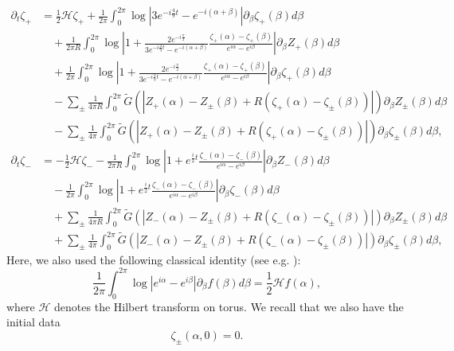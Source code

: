 \documentclass[11pt,reqno]{amsproc}
\newcommand{\ze}{\zeta}
\newcommand{\p}{\partial}
\newcommand{\pt}{\p_t}
\newcommand{\pb}{\p_\beta}
\newcommand{\calH}{\mathcal{H}}
\begin{document}
\begin{equation}
    \label{contourper}
    \begin{aligned}
    \pt \ze_+ &= \frac12 \calH \ze_+ + \frac{1}{2\pi}\int_0^{2\pi}\log\left|3e^{-i\frac49 t} - e^{-i(\alpha + \beta)}\right|\pb \ze_+(\beta) d\beta\\
    &\quad + \frac{1}{2\pi R}\int_0^{2\pi}\log\left|1+\frac{2e^{-i\frac\pi2}}{3e^{-i\frac49 t} - e^{-i(\alpha + \beta)}}\frac{\ze_+(\alpha)-\ze_+(\beta)}{e^{i\alpha} - e^{i\beta}}\right|\pb Z_+(\beta) d\beta\\
    &\quad + \frac{1}{2\pi}\int_0^{2\pi}\log\left|1+\frac{2e^{-i\frac\pi2}}{3e^{-i\frac49 t} - e^{-i(\alpha + \beta)}}\frac{\ze_+(\alpha)-\ze_+(\beta)}{e^{i\alpha} - e^{i\beta}}\right|\pb \ze_+(\beta) d\beta\\
    &\quad - \sum_{\pm} \frac{1}{4\pi R} \int_0^{2\pi} \tilde G(|Z_+(\alpha) - Z_\pm(\beta) + R(\ze_+(\alpha) - \ze_\pm(\beta))|) \pb Z_\pm(\beta) d\beta\\
    &\quad - \sum_{\pm} \frac{1}{4\pi} \int_0^{2\pi} \tilde G(|Z_+(\alpha) - Z_\pm(\beta) + R(\ze_+(\alpha) - \ze_\pm(\beta))|) \pb \ze_\pm(\beta) d\beta,\\
    \pt \ze_- &= -\frac12 \calH \ze_- - \frac{1}{2\pi R}\int_0^{2\pi} \log\left|1+ e^{\frac{i}{2} t} \frac{\ze_-(\alpha) - \ze_-(\beta)}{e^{i\alpha} - e^{i\beta}}\right| \pb Z_-(\beta) d\beta\\
    &\quad - \frac{1}{2\pi}\int_0^{2\pi}\log\left|1+ e^{\frac{i}{2} t} \frac{\ze_-(\alpha) - \ze_-(\beta)}{e^{i\alpha} - e^{i\beta}}\right| \pb \ze_-(\beta) d\beta\\
    &\quad + \sum_{\pm} \frac{1}{4\pi R} \int_0^{2\pi} \tilde G(|Z_-(\alpha) - Z_\pm(\beta) + R(\ze_-(\alpha) - \ze_\pm(\beta))|) \pb Z_\pm(\beta) d\beta\\
    &\quad + \sum_{\pm} \frac{1}{4\pi} \int_0^{2\pi} \tilde G(|Z_-(\alpha) - Z_\pm(\beta) + R(\ze_-(\alpha) - \ze_\pm(\beta))|) \pb \ze_\pm(\beta) d\beta,
    \end{aligned}
\end{equation}
Here, we also used the following classical identity (see e.g. \cite{farfield}):
$$
\frac{1}{2\pi}\int_0^{2\pi} \log|e^{i\alpha} - e^{i\beta}| \pb f(\beta) d\beta = \frac12 \calH f(\alpha),
$$
where $\calH$ denotes the Hilbert transform on torus. We recall that we also have the initial data
$$
\ze_\pm(\alpha,0) = 0.
$$
\end{document}
